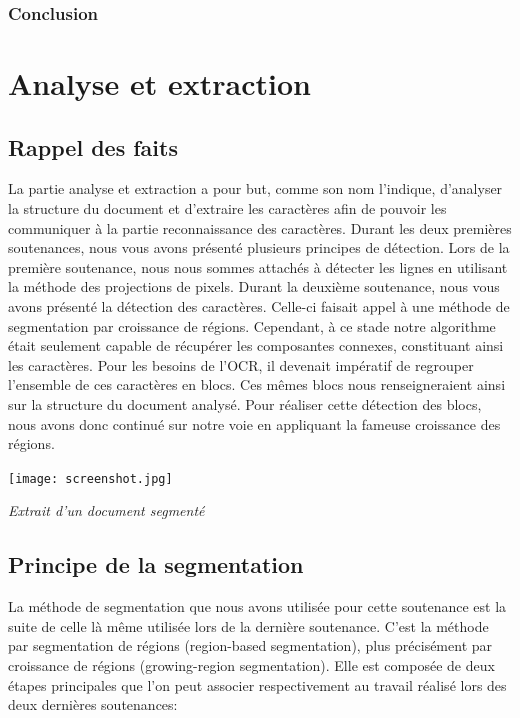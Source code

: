 \documentclass[a4paper,12pt]{report}
\begin{document}
\subsection{Conclusion}



\chapter{Analyse et extraction}

\section{Rappel des faits}

La partie analyse et extraction a pour but, comme son nom l'indique, d'analyser la
structure du document et d'extraire les caractères afin de pouvoir les communiquer à la
partie reconnaissance des caractères. Durant les deux premières soutenances, nous vous
avons présenté plusieurs principes de détection. Lors de la première soutenance, nous nous
sommes attachés à détecter les lignes en utilisant la méthode des projections de pixels.
Durant la deuxième soutenance, nous vous avons présenté la détection des
caractères. Celle-ci faisait appel à une méthode de segmentation par croissance de régions.
Cependant, à ce stade notre algorithme était seulement capable de récupérer les
composantes connexes, constituant ainsi les caractères. Pour les besoins de l'OCR, il
devenait impératif de regrouper l'ensemble de ces caractères en blocs. Ces mêmes blocs
nous renseigneraient ainsi sur la structure du document analysé. Pour réaliser cette
détection des blocs, nous avons donc continué sur notre voie en appliquant la fameuse
croissance des régions.

\begin{center}
  \texttt{[image: screenshot.jpg]}
  \caption{\emph{Extrait d'un document segment\'e}}
\end{center}



\section{Principe de la segmentation}

La méthode de segmentation que nous avons utilisée pour cette soutenance est la suite
de celle là même utilisée lors de la dernière soutenance. C'est la méthode par segmentation
de régions (region-based segmentation), plus précis\'ement par croissance de régions
(growing-region segmentation). Elle est composée de deux étapes principales que l'on peut
associer respectivement au travail réalisé lors des deux dernières soutenances:
\end{document}
